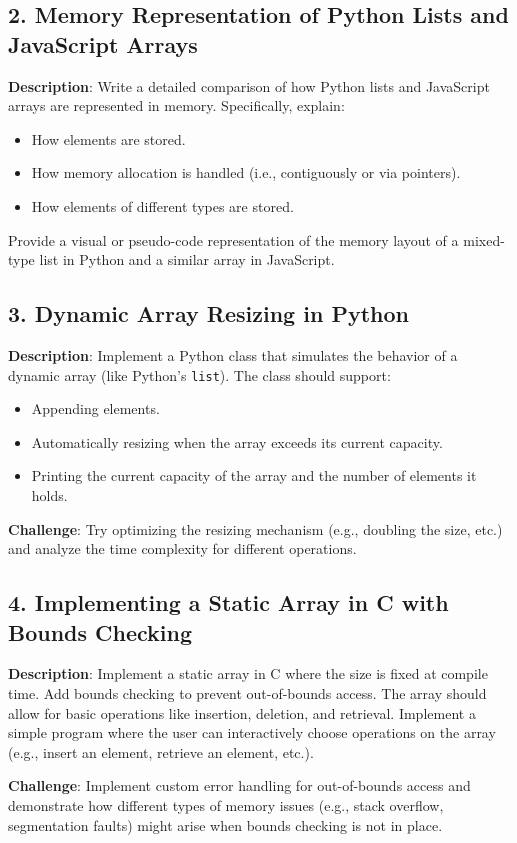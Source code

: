 \documentclass[12pt, oneside]{book}
\begin{document}
	\subsection*{2. Memory Representation of Python Lists and JavaScript Arrays}
	\textbf{Description}: Write a detailed comparison of how Python lists and JavaScript arrays are represented in memory. Specifically, explain:
	\begin{itemize}
		\item How elements are stored.
		\item How memory allocation is handled (i.e., contiguously or via pointers).
		\item How elements of different types are stored.
	\end{itemize}
	Provide a visual or pseudo-code representation of the memory layout of a mixed-type list in Python and a similar array in JavaScript.
	
	\subsection*{3. Dynamic Array Resizing in Python}
	\textbf{Description}: Implement a Python class that simulates the behavior of a dynamic array (like Python’s \texttt{list}). The class should support:
	\begin{itemize}
		\item Appending elements.
		\item Automatically resizing when the array exceeds its current capacity.
		\item Printing the current capacity of the array and the number of elements it holds.
	\end{itemize}
	\textbf{Challenge}: Try optimizing the resizing mechanism (e.g., doubling the size, etc.) and analyze the time complexity for different operations.
	
	\subsection*{4. Implementing a Static Array in C with Bounds Checking}
	\textbf{Description}: Implement a static array in C where the size is fixed at compile time. Add bounds checking to prevent out-of-bounds access. The array should allow for basic operations like insertion, deletion, and retrieval. Implement a simple program where the user can interactively choose operations on the array (e.g., insert an element, retrieve an element, etc.).
	
	\textbf{Challenge}: Implement custom error handling for out-of-bounds access and demonstrate how different types of memory issues (e.g., stack overflow, segmentation faults) might arise when bounds checking is not in place.
	
\end{document}
